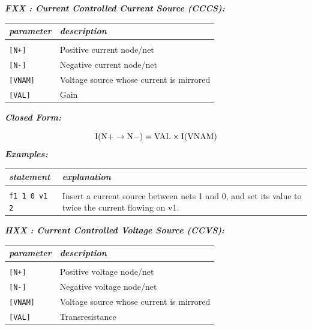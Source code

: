 \textbf{\textit{FXX : Current Controlled Current Source (CCCS):}}


\begin{longtable}{l l}
\textit{parameter} & \textit{description} \\ \hline \\ \vspace{-0.8\parskip}
\texttt{[N+]} & Positive current node/net \\
\texttt{[N-]} & Negative current node/net \\
\texttt{[VNAM]} & Voltage source  whose current is mirrored \\
\texttt{[VAL]} & Gain
\end{longtable}

\textbf{\textit{Closed Form:}}

  \[
    \rm{I}(\rm{N+}\to\rm{N-})= \rm{VAL}\times\rm{I}(\rm{VNAM})\nonumber
  \]
\textbf{\textit{Examples:}}

\begin{longtable}{l l}
\textit{statement} & \textit{explanation} \\ \hline \\ \vspace{-0.8\parskip} 
\begin{minipage}{15em}\texttt{f1 1 0 v1 2}\end{minipage}  
& 
\begin{minipage}{15em}{\small Insert a current source between nets 1 and 0, and set its value to twice the current flowing on v1.}\end{minipage}  
\end{longtable}

\textbf{\textit{HXX : Current Controlled Voltage Source (CCVS):}}


\begin{longtable}{l l}
\textit{parameter} & \textit{description} \\ \hline \\ \vspace{-0.8\parskip}
\texttt{[N+]} & Positive voltage node/net \\
\texttt{[N-]} & Negative voltage node/net \\
\texttt{[VNAM]} & Voltage source  whose current is mirrored \\
\texttt{[VAL]} & Transresistance
\end{longtable}

